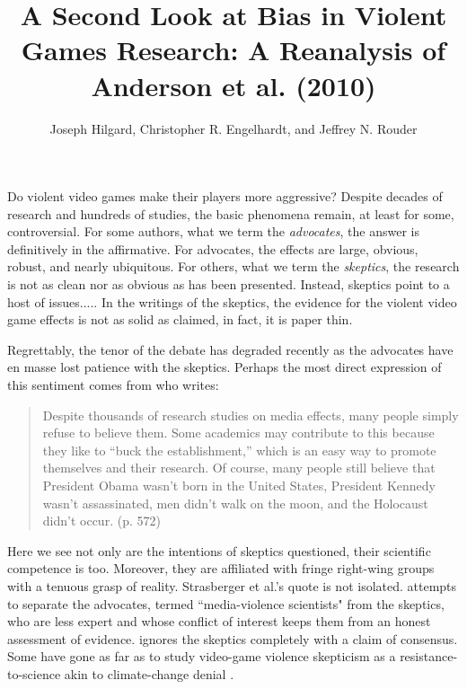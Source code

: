 \documentclass[man]{apa6}
\author{Joseph Hilgard, Christopher R. Engelhardt, and Jeffrey N. Rouder}
\title{A Second Look at Bias in Violent Games Research: A Reanalysis of Anderson et al. (2010)}
\affiliation{University of Missouri}
\begin{document}
\maketitle


Do violent video games make their players more aggressive? Despite decades of research and hundreds of studies, the basic phenomena remain, at least for some, controversial.  For some authors, what we term the {\em advocates}, the answer is definitively in the affirmative.  For advocates, the effects are large, obvious, robust, and nearly ubiquitous.  For others, what we term the {\em skeptics}, the research is not as clean nor as obvious as has been presented.  Instead, skeptics point to a host of issues.....  In the writings of the skeptics, the evidence for the violent video game effects is not as solid as claimed, in fact, it is paper thin.

Regrettably, the tenor of the debate has degraded recently as the advocates have en masse lost patience with the skeptics.  
Perhaps the most direct expression of this sentiment comes from \citet{Strasburger:etal:2014} who writes:

\begin{quote}
Despite thousands of research studies on media effects, many people simply refuse to believe them. Some academics may contribute to this because they like to ``buck the establishment,'' which is an easy way to promote themselves and their research. Of course, many people still believe that President Obama wasn't born in the United States, President Kennedy wasn't assassinated, men didn't walk on the moon, and the Holocaust didn't occur. (p. 572)
\end{quote}

Here we see not only are the intentions of skeptics questioned, their scientific competence is too.  Moreover, they are affiliated with fringe right-wing groups with a tenuous grasp of reality.  Strasberger et al.'s quote is not isolated. \citet{Anderson:etal:2014} attempts to separate the advocates, termed ``media-violence scientists" from the skeptics, who are less expert and whose conflict of interest keeps them from an honest assessment of evidence.    \citet{Bushman:etal:2014} ignores the skeptics completely with a claim of consensus. Some have gone as far as to study video-game violence skepticism as a resistance-to-science akin to climate-change denial \citep[see ][]{Greitemeyer:2014,Nauroth:etal:2014}.
\end{document}
